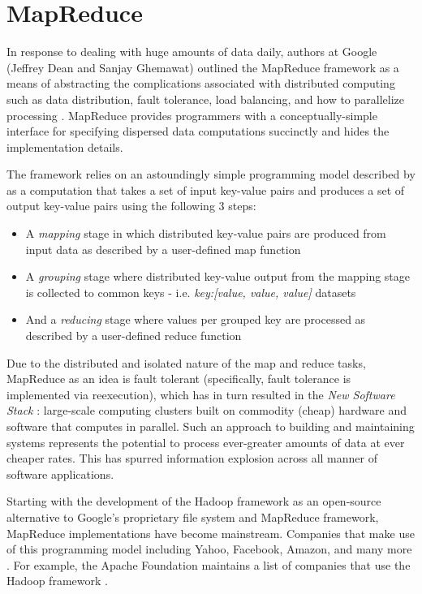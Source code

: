 \section{MapReduce}
In response to dealing with huge amounts of data daily, authors at Google (Jeffrey Dean and Sanjay Ghemawat) outlined the MapReduce framework as a means of abstracting the complications associated with distributed computing such as data distribution, fault tolerance, load balancing, and how to parallelize processing \cite{Dean:2008}. MapReduce provides programmers with a conceptually-simple interface for specifying dispersed data computations succinctly and hides the implementation details.

The framework relies on an astoundingly simple programming model described by \cite{Dean:2008} as a computation that takes a set of input key-value pairs and produces a set of output key-value pairs using the following 3 steps:

\begin{itemize}
    \item A \textit{mapping} stage in which distributed key-value pairs are produced from input data as described by a user-defined map function
    \item A \textit{grouping} stage where distributed key-value output from the mapping stage is collected to common keys - i.e. \textit{key:[value, value, value]} datasets
    \item And a \textit{reducing} stage where values per grouped key are processed as described by a user-defined reduce function
\end{itemize}

Due to the distributed and isolated nature of the map and reduce tasks, MapReduce as an idea is fault tolerant (specifically, fault tolerance is implemented via reexecution), which has in turn resulted in the \textit{New Software Stack} \cite{mining2011}: large-scale computing clusters built on commodity (cheap) hardware and software that computes in parallel. Such an approach to building and maintaining systems represents the potential to process ever-greater amounts of data at ever cheaper rates. This has spurred information explosion across all manner of software applications.

Starting with the development of the Hadoop framework as an open-source alternative to Google's proprietary file system and MapReduce framework, MapReduce implementations have become mainstream. Companies that make use of this programming model including Yahoo, Facebook, Amazon, and many more \cite{chandar2010}. For example, the Apache Foundation maintains a list of companies that use the Hadoop framework \cite{hadoopPower:2017}.

